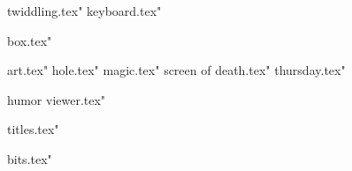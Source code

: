  twiddling.tex"
 keyboard.tex"




 box.tex"


 art.tex"
 hole.tex"
 magic.tex"
 screen of death.tex"
 thursday.tex"



 humor viewer.tex"


 titles.tex"






 bits.tex"



